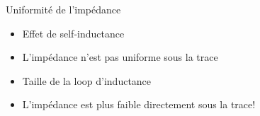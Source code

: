\begin{frame}{Uniformité de l'impédance}
    \begin{twocolumns}
        \leftcol
        \begin{itemize}
            \item Effet de self-inductance
            \item L'impédance n'est pas uniforme sous la trace
            \item Taille de la loop d'inductance
            \item L'impédance est plus faible directement sous la trace!
        \end{itemize}
        \rightcol
    \end{twocolumns}
\end{frame}

